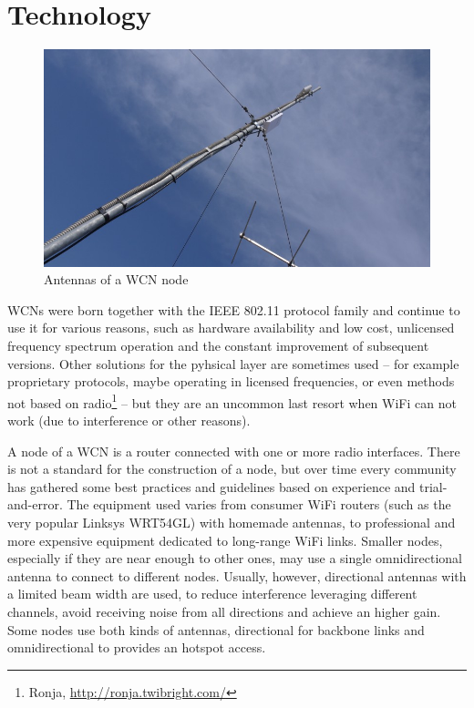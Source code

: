 \documentclass[oneside,openany]{memoir}
\begin{document}
\section{Technology}\label{technology}

\begin{figure}[htbp]
\centering
\includegraphics{images/ninux_node.png}
\caption{Antennas of a WCN node}
\end{figure}

WCNs were born together with the IEEE 802.11 protocol family and
continue to use it for various reasons, such as hardware availability
and low cost, unlicensed frequency spectrum operation and the constant
improvement of subsequent versions. Other solutions for the pyhsical
layer are sometimes used -- for example proprietary protocols, maybe
operating in licensed frequencies, or even methods not based on
radio\footnote{Ronja, \url{http://ronja.twibright.com/}} -- but they are
an uncommon last resort when WiFi can not work (due to interference or
other reasons).

A node of a WCN is a router connected with one or more radio interfaces.
There is not a standard for the construction of a node, but over time
every community has gathered some best practices and guidelines based on
experience and trial-and-error. The equipment used varies from consumer
WiFi routers (such as the very popular Linksys WRT54GL) with homemade
antennas, to professional and more expensive equipment dedicated to
long-range WiFi links. Smaller nodes, especially if they are near enough
to other ones, may use a single omnidirectional antenna to connect to
different nodes. Usually, however, directional antennas with a limited
beam width are used, to reduce interference leveraging different
channels, avoid receiving noise from all directions and achieve an
higher gain. Some nodes use both kinds of antennas, directional for
backbone links and omnidirectional to provides an hotspot access.
\end{document}
